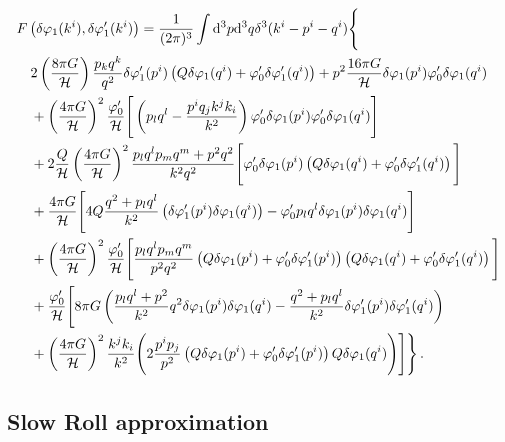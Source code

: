 \begin{align}
 \label{eq:Fdvk1-fourier-num}
&F\left(\dvp1(\kvi),\dvp1'(\kvi)\right)
= \frac{1}{(2\pi)^3}\int \d^3p \d^3q\delta^3(\kvi-\pvi-\qvi) 
\Bigg\{ \nonumber \\
% 
&\quad 2\left(\frac{8\pi G}{\H}\right)\frac{p_kq^k}{q^2}
\delta\vp_{1}'(\pvi)\left(Q\dvp1(\qvi)+\vp_{0}'\dvp1'(\qvi)\right)
+p^2\frac{16\pi G}{\H}\dvp1(\pvi)\vp_{0}'\dvp1(\qvi) \nonumber \\
% 
&\quad 
+\left(\frac{4\pi G}{\H}\right)^2
\frac{\vp_{0}'}{\H}\Bigg[
\left(p_lq^l-\frac{p^iq_jk^jk_i}{k^2}\right) 
\vp_{0}'\delta\vp_{1}(\pvi)\vp_{0}'\delta\vp_{1}(\qvi)
\Bigg]\nonumber\\
% 
&\quad +2\frac{Q}{\H}\left(\frac{4\pi G}{\H}\right)^2 
\frac{p_lq^lp_mq^m+p^2q^2}{k^2q^2}
\Bigg[\vp_{0}'\delta\vp_{1}(\pvi)
\left(Q\dvp1(\qvi)+\vp_{0}'\dvp1'(\qvi)\right)
\Bigg]
%
\nonumber\\
%
&\quad +\frac{4\pi G}{\H}
\Bigg[
4Q\frac{q^2+p_lq^l}{k^2}\left(
\dvp1'(\pvi)\dvp1(\qvi)\right)
-\vp_{0}'p_lq^l \delta\vp_{1}(\pvi)\delta\vp_{1}(\qvi)
\Bigg]
\nonumber\\
%
&\quad +\left(\frac{4\pi G}{\H}\right)^2
\frac{\vp_{0}'}{\H}\Bigg[
\frac{p_lq^lp_mq^m}{p^2q^2}
\left( Q\dvp1(\pvi)+\vp_{0}'\dvp1'(\pvi)\right)
\left(Q\dvp1(\qvi)+\vp_{0}'\dvp1'(\qvi)\right)
\Bigg]\nonumber\\
%
&\quad +\frac{\vp_{0}'}{\H}
\Bigg[
8\pi G\left(\frac{p_lq^l+p^2}{k^2}q^2\dvp1(\pvi)\dvp1(\qvi)
-\frac{q^2+p_lq^l}{k^2}\dvp1'(\pvi)\dvp1'(\qvi)
\right)
\nonumber\\
%
%
&\quad +\left(\frac{4\pi G}{\H}\right)^2
\frac{k^jk_i}{k^2}\Bigg(
2\frac{p^ip_j}{p^2}
\left(Q\dvp1(\pvi)+\vp_{0}'\dvp1'(\pvi)\right)
Q\dvp1(\qvi)
\Bigg)\Bigg]
\Bigg\}\,.
\end{align}


\subsection{Slow Roll approximation}
\label{sec:slowroll}



